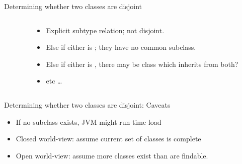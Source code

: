\begin{frame}{Determining whether two classes are disjoint}
  \begin{columns}[T]
    \begin{column}{0.45\textwidth}
      \usebox\classbox  
    \end{column}%
    \begin{column}{0.55\textwidth}

      \bigskip
      
      \begin{itemize}
      \item<1->{Explicit subtype relation; not disjoint.}
      \item<2->{Else if either is ; they have no common  subclass.}%
      \item<3>{Else if either is , there may be class which inherits from both?   }%
      \item<3>{etc \ldots }%
      \end{itemize}
    \end{column}%
  \end{columns}
\end{frame}


\begin{frame}{Determining whether two classes are disjoint: Caveats}

  \begin{itemize}
    \medskip
    \item If  no subclass exists, JVM might  run-time
      load 

    \item Closed world-view: assume current set of classes is complete

    \item Open world-view: assume more classes exist than are findable.

  \end{itemize}

\end{frame}
